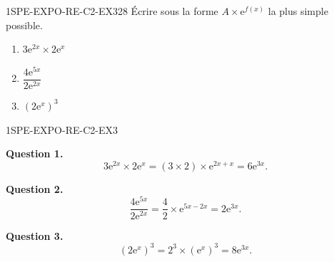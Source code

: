 \begin{exercice}{1SPE-EXPO-RE-C2-EX3}{2}{8}
Écrire sous la forme $A \times \mathrm{e}^{f(x)}$ la plus simple possible.
\begin{enumerate}
  \item $3\mathrm{e}^{2x} \times 2\mathrm{e}^{x}$
  \item $\dfrac{4\mathrm{e}^{5x}}{2\mathrm{e}^{2x}}$
  \item $\left(2\mathrm{e}^{x}\right)^3$
\end{enumerate}
\end{exercice}


\begin{corrige}{1SPE-EXPO-RE-C2-EX3}


\textbf{Question 1.}
\[
3\mathrm{e}^{2x} \times 2\mathrm{e}^{x} = (3 \times 2) \times \mathrm{e}^{2x+x} = 6\mathrm{e}^{3x}.
\]

\textbf{Question 2.}
\[
\frac{4\mathrm{e}^{5x}}{2\mathrm{e}^{2x}} = \frac{4}{2} \times \mathrm{e}^{5x-2x} = 2\mathrm{e}^{3x}.
\]

\textbf{Question 3.}
\[
\left(2\mathrm{e}^{x}\right)^3 = 2^3 \times \left(\mathrm{e}^{x}\right)^3 = 8\mathrm{e}^{3x}.
\]

\end{corrige}

